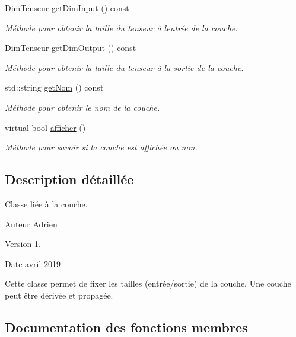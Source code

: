 \begin{DoxyCompactItemize}
\hyperlink{classDimTenseur}{Dim\+Tenseur} \hyperlink{classCouche_a4f3e4fe4a84f2dfcbee4bda6e20bdc03}{get\+Dim\+Input} () const
\begin{DoxyCompactList}\small\item\em Méthode pour obtenir la taille du tenseur à l\textquotesingle{}entrée de la couche. \end{DoxyCompactList}\item 
\hyperlink{classDimTenseur}{Dim\+Tenseur} \hyperlink{classCouche_ae8c80adf3a53da0d975e6f1148d0cea9}{get\+Dim\+Output} () const
\begin{DoxyCompactList}\small\item\em Méthode pour obtenir la taille du tenseur à la sortie de la couche. \end{DoxyCompactList}\item 
std\+::string \hyperlink{classCouche_a367bb58eaafab2b5fe635e6d3350fe4b}{get\+Nom} () const
\begin{DoxyCompactList}\small\item\em Méthode pour obtenir le nom de la couche. \end{DoxyCompactList}\item 
virtual bool \hyperlink{classCouche_a3c76d2c7a0adf864dc6f3f5fbf2c7563}{afficher} ()
\begin{DoxyCompactList}\small\item\em Méthode pour savoir si la couche est affichée ou non. \end{DoxyCompactList}\end{DoxyCompactItemize}


\subsection{Description détaillée}
Classe liée à la couche. 

\begin{DoxyAuthor}{Auteur}
Adrien 
\end{DoxyAuthor}
\begin{DoxyVersion}{Version}
1. 
\end{DoxyVersion}
\begin{DoxyDate}{Date}
avril 2019
\end{DoxyDate}
Cette classe permet de fixer les tailles (entrée/sortie) de la couche. Une couche peut être dérivée et propagée. 

\subsection{Documentation des fonctions membres}
\mbox{\label{classCouche_a3c76d2c7a0adf864dc6f3f5fbf2c7563}} 
